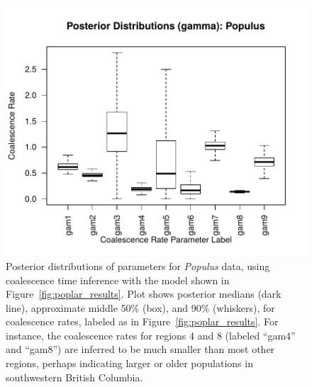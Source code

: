\documentclass{article}
\newif\ifsubmission
\begin{document}
\begin{figure}
\centering
    \includegraphics[width=\textwidth]{poplars/posterior_dists_gam_populus}
    \caption{
        Posterior distributions of parameters for \textit{Populus} data,
        using coalescence time inference with the model shown in Figure~\ref{fig:poplar_results}.
        Plot shows posterior medians (dark line),
        approximate middle 50\% (box), and 90\% (whiskers),
        for coalescence rates, labeled as in Figure~\ref{fig:poplar_results}.
        For instance, the coalescence rates for regions 4 and 8 (labeled ``gam4'' and ``gam8'')
        are inferred to be much smaller than most other regions, 
        perhaps indicating larger or older populations in southwestern British Columbia.
        \label{sfig:poplar_gam}
    }
\end{figure}

\ifsubmission
\processdelayedfloats
\fi

\newpage

\end{document}
